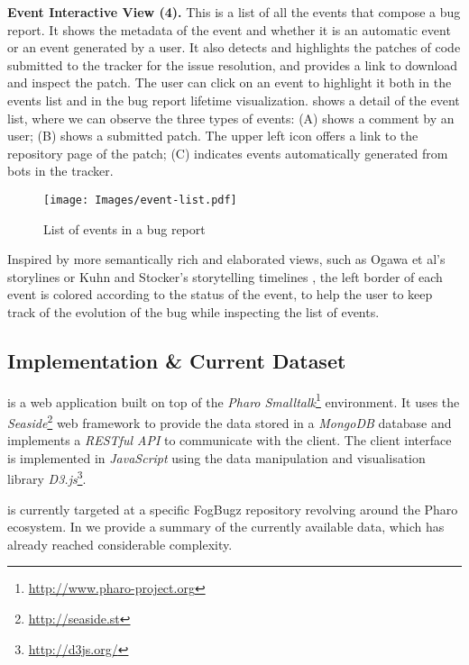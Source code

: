 \textbf{Event Interactive View (4).} This is a list of all the events that compose a bug report. It shows the metadata of the event and whether it is an automatic event or an event generated by a user. It also detects and highlights the patches of code submitted to the tracker for the issue resolution, and provides a link to download and inspect the patch. The user can click on an event to highlight it both in the events list and in the bug report lifetime visualization.  shows a detail of the event list, where we can observe the three types of events: (A) shows a comment by an user; (B) shows a submitted patch. The upper left icon offers a link to the repository page of the patch; (C) indicates events automatically generated from bots in the tracker. \\
\begin{figure}[ht]
\begin{center}
\texttt{[image: Images/event-list.pdf]}
\caption{List of events in a bug report}
\label{fig-event-list}
\end{center}
\end{figure}
\indent{}Inspired by more semantically rich and elaborated views, such as Ogawa et al's storylines \cite{Ogaw2010a} or Kuhn and Stocker's storytelling timelines \cite{Kuhn2012a}, the left border of each event is colored according to the status of the event, to help the user to keep track of the evolution of the bug while inspecting the list of events. 

\subsection{Implementation \& Current Dataset}

\ib is a web application built on top of the \textit{Pharo Smalltalk}\footnote{\url{http://www.pharo-project.org}} environment. It uses the \textit{Seaside}\footnote{\url{http://seaside.st}} web framework to provide the data stored in a \textit{MongoDB} database and implements a \textit{RESTful API} to communicate with the client. The client interface is implemented in \textit{JavaScript} using the data manipulation and visualisation library \textit{D3.js}\footnote{\url{http://d3js.org/}}.

\ib is currently targeted at a specific FogBugz repository revolving around the Pharo ecosystem. In  we provide a summary of the currently available data, which has already reached considerable complexity.

